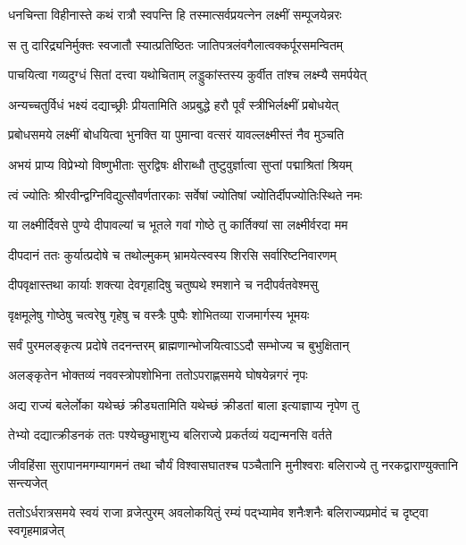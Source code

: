\twolineshloka
{धनचिन्ता विहीनास्ते कथं रात्रौ स्वपन्ति हि}
{तस्मात्सर्वप्रयत्नेन लक्ष्मीं सम्पूजयेन्नरः} %

\twolineshloka
{स तु दारिद्र्यनिर्मुक्तः स्वजातौ स्यात्प्रतिष्ठितः}
{जातिपत्रलंवगैलात्वक्कर्पूरसमन्वितम्} %

\twolineshloka
{पाचयित्वा गव्यदुग्धं सितां दत्त्वा यथोचिताम्}
{लड्डुकांस्तस्य कुर्वीत तांश्च लक्ष्म्यै समर्पयेत्} %

\twolineshloka
{अन्यच्चतुर्विधं भक्ष्यं दद्याच्छ्रीः प्रीयतामिति}
{अप्रबुद्धे हरौ पूर्वं स्त्रीभिर्लक्ष्मीं प्रबोधयेत्} %

\twolineshloka
{प्रबोधसमये लक्ष्मीं बोधयित्वा भुनक्ति या}
{पुमान्वा वत्सरं यावल्लक्ष्मीस्तं नैव मुञ्चति} %

\twolineshloka
{अभयं प्राप्य विप्रेभ्यो विष्णुभीताः सुरद्विषः}
{क्षीराब्धौ तुष्टुवुर्ज्ञात्वा सुप्तां पद्माश्रितां श्रियम्} %

\twolineshloka
{त्वं ज्योतिः श्रीरवीन्द्वग्निविद्युत्सौवर्णतारकाः}
{सर्वेषां ज्योतिषां ज्योतिर्दीपज्योतिःस्थिते नमः} %

\twolineshloka
{या लक्ष्मीर्दिवसे पुण्ये दीपावल्यां च भूतले}
{गवां गोष्ठे तु कार्तिक्यां सा लक्ष्मीर्वरदा मम} %

\twolineshloka
{दीपदानं ततः कुर्यात्प्रदोषे च तथोल्मुकम्}
{भ्रामयेत्स्वस्य शिरसि सर्वारिष्टनिवारणम्} %

\twolineshloka
{दीपवृक्षास्तथा कार्याः शक्त्या देवगृहादिषु}
{चतुष्पथे श्मशाने च नदीपर्वतवेश्मसु} %

\twolineshloka
{वृक्षमूलेषु गोष्ठेषु चत्वरेषु गृहेषु च}
{वस्त्रैः पुष्पैः शोभितव्या राजमार्गस्य भूमयः} %

\twolineshloka
{सर्वं पुरमलङ्कृत्य प्रदोषे तदनन्तरम्}
{ब्राह्मणान्भोजयित्वाऽऽदौ सम्भोज्य च बुभुक्षितान्} %

\twolineshloka
{अलङ्कृतेन भोक्तव्यं नववस्त्रोपशोभिना}
{ततोऽपराह्णसमये घोषयेन्नगरं नृपः} %

\twolineshloka
{अद्य राज्यं बलेर्लोका यथेच्छं क्रीड्यतामिति}
{यथेच्छं क्रीडतां बाला इत्याज्ञाप्य नृपेण तु} %

\twolineshloka
{तेभ्यो दद्यात्क्रीडनकं ततः पश्येच्छुभाशुभ्य}
{बलिराज्ये प्रकर्तव्यं यद्यन्मनसि वर्तते} %

\threelineshloka
{जीवहिंसा सुरापानमगम्यागमनं तथा}
{चौर्यं विश्वासघातश्च पञ्चैतानि मुनीश्वराः}
{बलिराज्ये तु नरकद्वाराण्युक्तानि सन्त्यजेत्} %

\threelineshloka
{ततोऽर्धरात्रसमये स्वयं राजा व्रजेत्पुरम्}
{अवलोकयितुं रम्यं पद्भ्यामेव शनैःशनैः}
{बलिराज्यप्रमोदं च दृष्ट्वा स्वगृहमाव्रजेत्} %

